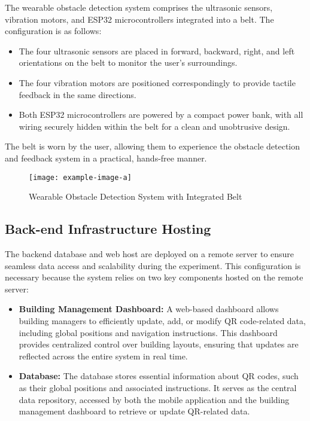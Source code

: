 The wearable obstacle detection system comprises the ultrasonic sensors, vibration motors, and ESP32 microcontrollers integrated into a belt. The configuration is as follows:

\begin{itemize}
	\item The four ultrasonic sensors are placed in forward, backward, right, and left orientations on the belt to monitor the user’s surroundings.
	\item The four vibration motors are positioned correspondingly to provide tactile feedback in the same directions.
	\item Both ESP32 microcontrollers are powered by a compact power bank, with all wiring securely hidden within the belt for a clean and unobtrusive design.
\end{itemize}

The belt is worn by the user, allowing them to experience the obstacle detection and feedback system in a practical, hands-free manner.

\begin{figure}[h]
	\centering
	\texttt{[image: example-image-a]}
	\caption{Wearable Obstacle Detection System with Integrated Belt}
	\label{fig:belt_setup}
\end{figure}

\subsection{Back-end Infrastructure Hosting}

The backend database and web host are deployed on a remote server to ensure seamless data access and scalability during the experiment. This configuration is necessary because the system relies on two key components hosted on the remote server:

\begin{itemize}
	\item \textbf{Building Management Dashboard:} A web-based dashboard allows building managers to efficiently update, add, or modify QR code-related data, including global positions and navigation instructions. This dashboard provides centralized control over building layouts, ensuring that updates are reflected across the entire system in real time.
	\item \textbf{Database:} The database stores essential information about QR codes, such as their global positions and associated instructions. It serves as the central data repository, accessed by both the mobile application and the building management dashboard to retrieve or update QR-related data.
\end{itemize}

